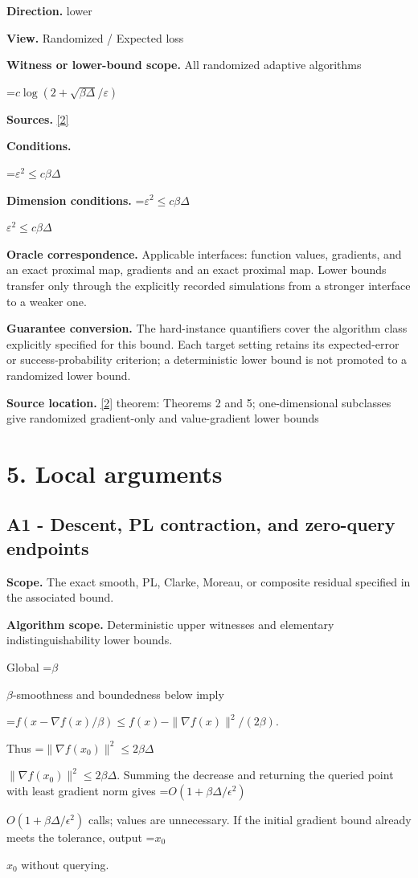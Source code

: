 \documentclass[10pt,a4paper]{article}
\newcommand{\AtlasMath}[1]{\par\begingroup\centering\setbox0=\hbox{$\displaystyle #1$}\ifdim\wd0>1.4\linewidth\typeout{ATLAS WIDE FORMULA: \the\wd0}\fi\ifdim\wd0>\linewidth\resizebox{\linewidth}{!}{\box0}\else\box0\fi\par\endgroup}
\newcommand{\AtlasInlineMath}[1]{\begingroup\setbox0=\hbox{$#1$}\ifdim\wd0>.4\linewidth\endgroup\AtlasMath{#1}\else\endgroup$#1$\fi}
\begin{document}
\textbf{Direction.} lower

\textbf{View.} Randomized / Expected loss

\textbf{Witness or lower-bound scope.} All randomized adaptive algorithms

\AtlasMath{c\log(2+\sqrt{\beta\Delta}/\varepsilon)}
\textbf{Sources.} \href{https://arxiv.org/pdf/2209.07513}{[2]}

\textbf{Conditions.} 
\AtlasMath{\varepsilon^2\le c\beta\Delta}


\textbf{Dimension conditions.} \AtlasInlineMath{\varepsilon^2\le c\beta\Delta}

\textbf{Oracle correspondence.} Applicable interfaces: function values, gradients, and an exact proximal map, gradients and an exact proximal map. Lower bounds transfer only through the explicitly recorded simulations from a stronger interface to a weaker one.

\textbf{Guarantee conversion.} The hard-instance quantifiers cover the algorithm class explicitly specified for this bound. Each target setting retains its expected-error or success-probability criterion; a deterministic lower bound is not promoted to a randomized lower bound.

\textbf{Source location.} \href{https://arxiv.org/pdf/2209.07513}{[2]} theorem: Theorems 2 and 5; one-dimensional subclasses give randomized gradient-only and value-gradient lower bounds

\section{5. Local arguments}
\subsection{A1 - Descent, PL contraction, and zero-query endpoints}
\textbf{Scope.} The exact smooth, PL, Clarke, Moreau, or composite residual specified in the associated bound.

\textbf{Algorithm scope.} Deterministic upper witnesses and elementary indistinguishability lower bounds.

Global \AtlasInlineMath{\beta}-smoothness and boundedness below imply

\AtlasMath{f(x-\nabla f(x)/\beta)\le f(x)-\|\nabla f(x)\|^2/(2\beta).}

Thus \AtlasInlineMath{\|\nabla f(x_0)\|^2\le2\beta\Delta}. Summing the decrease and returning the queried point with least gradient norm gives \AtlasInlineMath{O(1+\beta\Delta/\epsilon^2)} calls; values are unnecessary. If the initial gradient bound already meets the tolerance, output \AtlasInlineMath{x_0} without querying.
\end{document}
